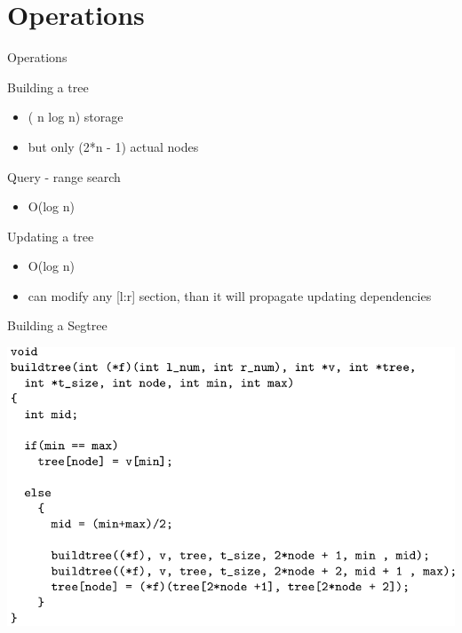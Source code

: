 \documentclass[presentation,12pt]{beamer}
\begin{document}
\section{Operations}
\label{sec:org330fa8b}
\begin{frame}[label={sec:orgf316d2a}]{Operations}
\begin{block}{Building a tree}
\begin{itemize}
\item ( n log n) storage
\item but only (2*n - 1) actual nodes
\end{itemize}
\end{block}
\begin{block}{Query - range search}
\begin{itemize}
\item O(log n)
\end{itemize}
\end{block}
\begin{block}{Updating a tree}
\begin{itemize}
\item O(log n)
\item can modify any [l:r] section, than it will propagate updating dependencies
\end{itemize}
\end{block}
\end{frame}
\begin{frame}[label={sec:org9f2a104}]{Building a Segtree}
\begin{center}
\includegraphics[width=.9\linewidth]{./img/build.png}
\end{center}
\end{frame}
\end{document}

